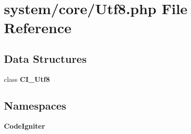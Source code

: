 \section{system/core/\-Utf8.php File Reference}
\label{_utf8_8php}
\subsection*{Data Structures}
\begin{DoxyCompactItemize}
\item 
class {\bf C\-I\-\_\-\-Utf8}
\end{DoxyCompactItemize}
\subsection*{Namespaces}
\begin{DoxyCompactItemize}
\item 
{\bf Code\-Igniter}
\end{DoxyCompactItemize}
